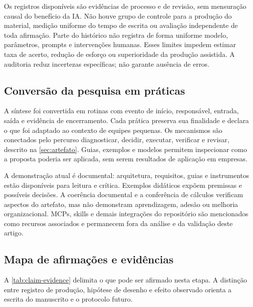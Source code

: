 Os registros disponíveis são evidências de processo e de revisão, sem mensuração causal do benefício da IA. Não houve grupo de controle para a produção do material, medição uniforme do tempo de escrita ou avaliação independente de toda afirmação. Parte do histórico não registra de forma uniforme modelo, parâmetros, prompts e intervenções humanas. Esses limites impedem estimar taxa de acerto, redução de esforço ou superioridade da produção assistida. A auditoria reduz incertezas específicas; não garante ausência de erros.

\subsection{Conversão da pesquisa em práticas}

A síntese foi convertida em rotinas com evento de início, responsável, entrada, saída e evidência de encerramento. Cada prática preserva sua finalidade e declara o que foi adaptado ao contexto de equipes pequenas. Os mecanismos são conectados pelo percurso diagnosticar, decidir, executar, verificar e revisar, descrito na \cref{sec:artefato}. Guias, exemplos e modelos permitem inspecionar como a proposta poderia ser aplicada, sem serem resultados de aplicação em empresas.

A demonstração atual é documental: arquitetura, requisitos, guias e instrumentos estão disponíveis para leitura e crítica. Exemplos didáticos expõem premissas e possíveis decisões. A coerência documental e a conferência de cálculos verificam aspectos do artefato, mas não demonstram aprendizagem, adesão ou melhoria organizacional. MCPs, skills e demais integrações do repositório são mencionados como recursos associados e permanecem fora da análise e da validação deste artigo.

\subsection{Mapa de afirmações e evidências}

A \cref{tab:claim-evidence} delimita o que pode ser afirmado nesta etapa. A distinção entre registro de produção, hipótese de desenho e efeito observado orienta a escrita do manuscrito e o protocolo futuro.


